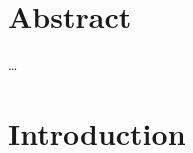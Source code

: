 \documentclass[11pt]{article}
\begin{document}




\tableofcontents
\newpage{}
\section{Abstract}
\ldots 

\newpage{}

\section{Introduction}
\end{document}

